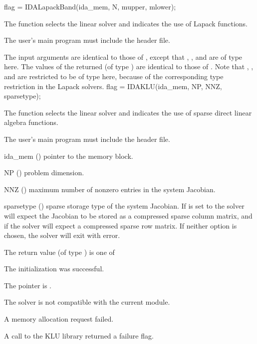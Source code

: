 {
  flag = IDALapackBand(ida\_mem, N, mupper, mlower);
}
{
  The function  selects the {\idaband} linear solver and
  indicates the use of Lapack functions. 

  The user's main program must include the  header file.
}
{
  The input arguments are identical to those of , except
  that , , and  are of type  here.
}
{
  The values of the returned  (of type ) are identical
  to those of .
}
{
  Note that , , and  are restricted to be of type 
  here, because of the corresponding type restriction in the Lapack solvers.
}
{
  flag = IDAKLU(ida\_mem, NP, NNZ, sparsetype);
}
{
  The function  selects the {\idaklu} linear solver and indicates
  the use of sparse direct linear algebra functions. 

  The user's main program must include the  header file.
}
{
  \begin{args}
  \item[ida\_mem] ()
    pointer to the {\idas} memory block.
  \item[NP] ()
    problem dimension.
  \item[NNZ] ()
    maximum number of nonzero entries in the system Jacobian.
  \item[sparsetype] ()
    sparse storage type of the system Jacobian. If  is  
    set to  the solver will expect the Jacobian to be stored as 
    a compressed sparse column matrix, and if  
    the solver will expect a compressed sparse row matrix. 
    If neither option is chosen, the solver will exit with error.
  \end{args}
}
{
  The return value  (of type ) is one of
  \begin{args}
  \item[\Id{IDASLS\_SUCCESS}] 
    The {\idaklu} initialization was successful.
  \item[\Id{IDASLS\_MEM\_NULL}]
    The  pointer is .
  \item[\Id{IDASLS\_ILL\_INPUT}]
    The {\idaklu} solver is not compatible with the current {\nvector} module.
  \item[\Id{IDASLS\_MEM\_FAIL}]
    A memory allocation request failed.
  \item[\Id{IDASLS\_PACKAGE\_FAIL}]
    A call to the KLU library returned a failure flag.
  \end{args}
}

